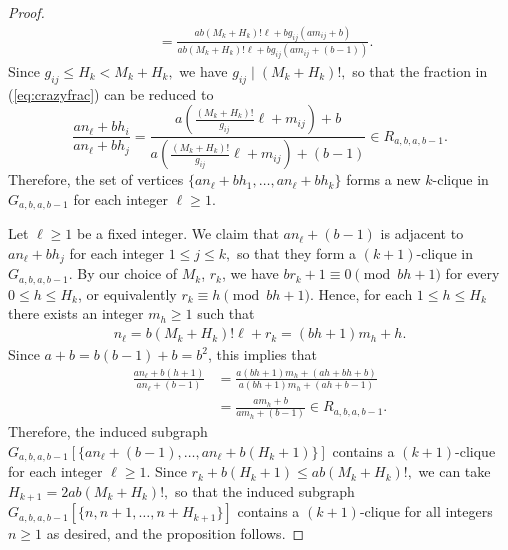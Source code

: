 \documentclass[10pt,a4paper]{amsart}
\renewcommand{\geq}{\geqslant}
\renewcommand{\leq}{\leqslant}
\begin{document}
\begin{proof}
\begin{align}
&=  \frac{a  b (M_k+H_k)! {\ell}+bg_{ij}(am_{ij}+b)}{a  b (M_k+H_k)! {\ell}+bg_{ij} (am_{ij}+(b-1))}.  \label{eq:crazyfrac}
\end{align}
Since $g_{ij} \leq H_k < M_k+H_k,$ we have $g_{ij} \mid (M_k+H_k)!,$ so that the fraction in (\ref{eq:crazyfrac}) can be reduced to
\begin{equation*}
\frac{an_{\ell}+bh_i}{an_{\ell}+bh_j} = \frac{a \left( \frac{(M_k+H_k)!}{g_{ij}}{\ell}+m_{ij} \right)+b}{a \left( \frac{(M_k+H_k)!}{g_{ij}}{\ell}+m_{ij} \right)+(b-1)} \in R_{a,b,a,b-1}.
\end{equation*}
Therefore, the set of vertices $\{ an_{\ell}+bh_1, \ldots, an_{\ell}+bh_k \}$ forms a new $k$-clique in $G_{a,b,a,b-1}$ for each integer ${\ell} \geq 1$. 

Let ${\ell} \geq 1$ be a fixed integer. We claim that $an_{\ell}+(b-1)$ is adjacent to $an_{\ell}+bh_j$ for each integer $1 \leq j \leq k,$ so that they form a $(k+1)$-clique in $G_{a,b,a,b-1}.$ By our choice of $M_k$, $r_k$, we have $br_k+1\equiv 0 \pmod{bh+1}$ for every $0\leq h\leq H_k$, or equivalently $r_k\equiv h\pmod{bh+1}$. Hence, for each $1\leq h\leq H_k$ there exists an integer $m_h \geq 1$ such that 
\begin{align*}
n_{\ell} = b(M_k+H_k)! {\ell} +r_k = (bh+1)m_h +h.
\end{align*}
Since $a+b = b(b-1)+b = b^2$, this implies that
\begin{align}
\frac{an_{\ell}+b(h+1)}{an_{\ell}+(b-1)} &= \frac{a(bh+1)m_h+ (ah+bh+b)}{a(bh+1)m_h+(ah+b-1)} \nonumber \\
&= \frac{am_h+b}{am_h+(b-1)} \in R_{a,b,a,b-1}. \label{eq:red2}
\end{align}
Therefore, the induced subgraph $G_{a,b,a,b-1}[\{an_{\ell}+(b-1), \ldots, an_{\ell}+b(H_k+1) \}]$ contains a $(k+1)$-clique for each integer ${\ell} \geq 1$. Since $r_k+b(H_k+1) \leq ab(M_k+H_k)!, $ we can take $H_{k+1}=2ab(M_k+H_k)!,$ so that
 the induced subgraph $G_{a,b,a,b-1}[\{n, n+1, \ldots, n+H_{k+1}\}]$ contains a $(k+1)$-clique for all integers $n \geq 1$ as desired, and the proposition follows.
\end{proof}
\end{document}
